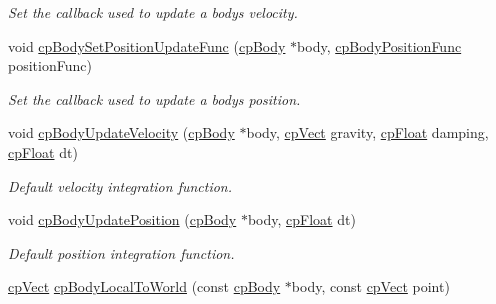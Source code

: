 \begin{DoxyCompactItemize}
\begin{DoxyCompactList}\small\item\em Set the callback used to update a body\textquotesingle{}s velocity. \end{DoxyCompactList}\item 
void \hyperlink{group__cp_body_ga975175814a1c1508b60d9207787a4f36}{cp\+Body\+Set\+Position\+Update\+Func} (\hyperlink{structcp_body}{cp\+Body} $\ast$body, \hyperlink{group__cp_body_ga3386e3b0b4156289ab6099cc64c952e7}{cp\+Body\+Position\+Func} position\+Func)
\begin{DoxyCompactList}\small\item\em Set the callback used to update a body\textquotesingle{}s position. \end{DoxyCompactList}\item 
\hypertarget{group__cp_body_gac62dea8fe94b2b405665f8b7c373d4d1}{}void \hyperlink{group__cp_body_gac62dea8fe94b2b405665f8b7c373d4d1}{cp\+Body\+Update\+Velocity} (\hyperlink{structcp_body}{cp\+Body} $\ast$body, \hyperlink{structcp_vect}{cp\+Vect} gravity, \hyperlink{group__basic_types_gac1ed65573e035bf892505768c852d8d3}{cp\+Float} damping, \hyperlink{group__basic_types_gac1ed65573e035bf892505768c852d8d3}{cp\+Float} dt)\label{group__cp_body_gac62dea8fe94b2b405665f8b7c373d4d1}

\begin{DoxyCompactList}\small\item\em Default velocity integration function. \end{DoxyCompactList}\item 
\hypertarget{group__cp_body_gaa42e82480140a790aabbe72b71ee929b}{}void \hyperlink{group__cp_body_gaa42e82480140a790aabbe72b71ee929b}{cp\+Body\+Update\+Position} (\hyperlink{structcp_body}{cp\+Body} $\ast$body, \hyperlink{group__basic_types_gac1ed65573e035bf892505768c852d8d3}{cp\+Float} dt)\label{group__cp_body_gaa42e82480140a790aabbe72b71ee929b}

\begin{DoxyCompactList}\small\item\em Default position integration function. \end{DoxyCompactList}\item 
\hypertarget{group__cp_body_ga7b6f5e908446262341f0e6b22ffd2950}{}\hyperlink{structcp_vect}{cp\+Vect} \hyperlink{group__cp_body_ga7b6f5e908446262341f0e6b22ffd2950}{cp\+Body\+Local\+To\+World} (const \hyperlink{structcp_body}{cp\+Body} $\ast$body, const \hyperlink{structcp_vect}{cp\+Vect} point)\label{group__cp_body_ga7b6f5e908446262341f0e6b22ffd2950}


\end{DoxyCompactItemize}
